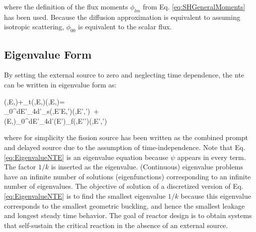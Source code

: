  where the definition of the flux moments \(\phi_{lm}\) from Eq. \eqref{eq:SHGeneralMoments} has been used. Because the diffusion approximation is equivalent to assuming isotropic scattering, \(\phi_{00}\) is equivalent to the scalar flux.
 
\subsection{Eigenvalue Form}
\label{sec:EigenvalueForm}
By setting the external source to zero and neglecting time dependence, the \gls{nte} can be written in eigenvalue form as:

\beqa
\label{eq:EigenvalueNTE}
\hO\cdot\nabla\psi(,E,\hO)+\Sigma_t(,E,\hO)\psi(,E,\hO)=\hspace{2cm}\\
\int_0^\infty dE'\int_{4\pi}d\hO'\Sigma_s(,E'\rightarrow E,\hO'\rightarrow\hO)\psi(,E',\hO')\ +\hspace{1cm}\\
\chi(E,\hO)\int_0^\infty dE'\int_{4\pi}d\hO'\nu(E')\Sigma_f(,E'\hO')\psi(,E',\hO')
\eeqa

where for simplicity the fission source has been written as the combined prompt and delayed source due to the assumption of time-independence. Note that Eq. \eqref{eq:EigenvalueNTE} is an eigenvalue equation because \(\psi\) appears in every term. The factor \(1/k\) is inserted as the eigenvalue. (Continuous) eigenvalue problems have an infinite number of solutions (eigenfunctions) corresponding to an infinite number of eigenvalues. The objective of solution of a discretized version of Eq. \eqref{eq:EigenvalueNTE} is to find the smallest eigenvalue \(1/k\) because this eigenvalue corresponds to the smallest geometric buckling, and hence the smallest leakage and longest steady time behavior. The goal of reactor design is to obtain systems that self-sustain the critical reaction in the absence of an external source.

